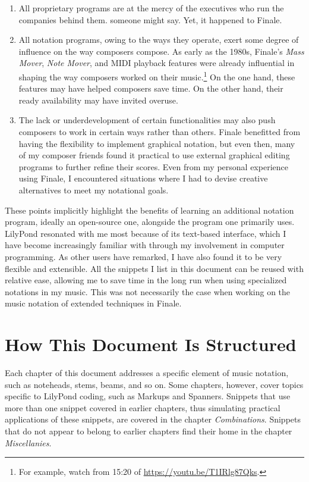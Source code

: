 \begin{enumerate}

\item All proprietary programs are at the mercy of the executives who run the companies behind them.  someone might say. Yet, it happened to Finale. 

\item All notation programs, owing to the ways they operate, exert some degree of influence on the way composers compose. As early as the 1980s, Finale's \textit{Mass Mover}, \textit{Note Mover}, and MIDI playback features were already influential in shaping the way composers worked on their music.\footnote{For example, watch from 15:20 of \url{https://youtu.be/T1IRlg87Qks}.} On the one hand, these features may have helped composers save time. On the other hand, their ready availability may have invited overuse. 

\item The lack or underdevelopment of certain functionalities may also push composers to work in certain ways rather than others. Finale benefitted from having the flexibility to implement graphical notation, but even then, many of my composer friends found it practical to use external graphical editing programs to further refine their scores. Even from my personal experience using Finale, I encountered situations where I had to devise creative alternatives to meet my notational goals. 
\end{enumerate}

These points implicitly highlight the benefits of learning an additional notation program, ideally an open-source one, alongside the program one primarily uses. LilyPond resonated with me most because of its text-based interface, which I have become increasingly familiar with through my involvement in computer programming. As other users have remarked, I have also found it to be very flexible and extensible. All the snippets I list in this document can be reused with relative ease, allowing me to save time in the long run when using specialized notations in my music. This was not necessarily the case when working on the music notation of extended techniques in Finale.


\section{How This Document Is Structured}
Each chapter of this document addresses a specific element of music notation, such as noteheads, stems, beams, and so on. Some chapters, however, cover topics specific to LilyPond coding, such as Markups and Spanners. Snippets that use more than one snippet covered in earlier chapters, thus simulating practical applications of these snippets, are covered in the chapter \textit{Combinations}. Snippets that do not appear to belong to earlier chapters find their home in the chapter \textit{Miscellanies}.

